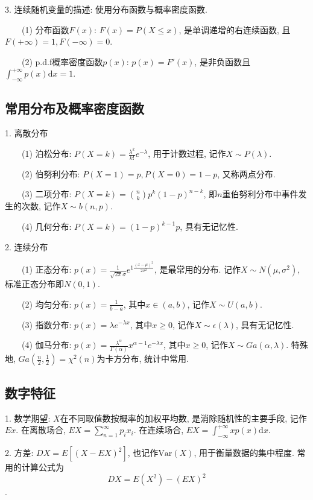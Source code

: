 3. 连续随机变量的描述: 使用分布函数与概率密度函数.

~~~~(1) 分布函数$F(x)$: $F(x)=P(X \leq x)$, 是单调递增的右连续函数, 且$F(+\infty)=1, F(-\infty)=0$.

~~~~(2) p.d.f概率密度函数$p(x)$: $p(x)=F'(x)$, 是非负函数且$\int_{-\infty}^{+\infty} p(x)\mathrm{d}x=1$.

\subsection{常用分布及概率密度函数}

1. 离散分布

~~~~(1) 泊松分布: $P(X=k)=\frac{\lambda^k}{k!}e^{-\lambda}$, 用于计数过程, 记作$X\sim P(\lambda)$.

~~~~(2) 伯努利分布: $P(X=1)=p, P(X=0)=1-p$, 又称两点分布.

~~~~(3) 二项分布: $P(X=k)=\binom{n}{k}p^k(1-p)^{n-k}$, 即$n$重伯努利分布中事件发生的次数, 记作$X\sim b(n,p)$.

~~~~(4) 几何分布: $P(X=k)=(1-p)^{k-1}p$, 具有无记忆性.

2. 连续分布

~~~~(1) 正态分布: $p(x)=\frac{1}{\sqrt{2\pi}\sigma}e^{1\frac{(x-\mu)^2}{2\sigma^2}}$, 是最常用的分布. 记作$X\sim N(\mu, \sigma^2)$, 标准正态分布即$N(0,1)$.

~~~~(2) 均匀分布: $p(x)=\frac{1}{b-a}$, 其中$x \in (a,b)$, 记作$X \sim U(a,b)$.

~~~~(3) 指数分布: $p(x)=\lambda e^{-\lambda x}$, 其中$x \geq 0$, 记作$X\sim \epsilon(\lambda)$, 具有无记忆性.

~~~~(4) 伽马分布: $p(x)=\frac{\lambda^\alpha}{\Gamma(\alpha)}x^{\alpha-1}e^{-\lambda x}$, 其中$x\geq 0$, 记作$X\sim Ga(\alpha,\lambda)$. 特殊地, $Ga(\frac{n}{2},\frac{1}{2})=\chi^2(n)$为卡方分布, 统计中常用.

\subsection{数字特征}

1. 数学期望: $X$在不同取值数按概率的加权平均数, 是消除随机性的主要手段, 记作$Ex$.
在离散场合, $EX=\sum\limits_{n=1}^\infty p_ix_i$. 在连续场合, $EX=\int_{-\infty}^{+\infty}xp(x)\mathrm{d}x$.

2. 方差: $DX=E[(X-EX)^2]$, 也记作$\text{Var}(X)$, 用于衡量数据的集中程度. 常用的计算公式为
\begin{equation*}
    DX=E(X^2)-(EX)^2
\end{equation*}.

